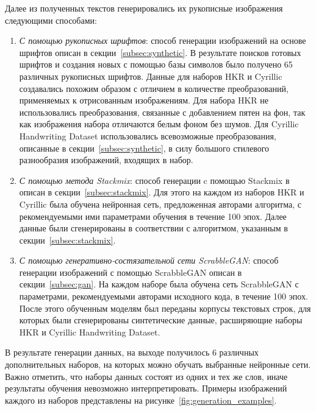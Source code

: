 Далее из полученных текстов генерировались их рукописные изображения следующими способами:
\begin{enumerate}
    \item \textit{С помощью рукописных шрифтов}:
    способ генерации изображений на основе шрифтов описан в секции~\ref{subsec:synthetic}.
    В результате поисков готовых шрифтов и создания новых с помощью базы символов было получено 65 различных рукописных шрифтов.
    Данные для наборов HKR и Cyrillic создавались похожим образом с отличием в количестве преобразований, применяемых к отрисованным изображениям.
    Для набора HKR не использовались преобразования, связанные с добавлением пятен на фон, так как изображения набора отличаются белым фоном без шумов.
    Для Cyrillic Handwriting Dataset использовались всевозможные преобразования, описанные в секции~\ref{subsec:synthetic},
    в силу большого стилевого разнообразия изображений, входящих в набор.
    \item \textit{С помощью метода Stackmix}:
    способ генерации c помощью Stackmix в описан в секции~\ref{subsec:stackmix}.
    Для этого на каждом из наборов HKR и Cyrillic была обучена нейронная сеть, предложенная авторами алгоритма,
    с рекомендуемыми ими параметрами обучения в течение 100 эпох.
    Далее данные были сгенерированы в соответствии с алгоритмом, указанным в секции~\ref{subsec:stackmix}.
    \item \textit{С помощью генеративно-состязательной сети ScrabbleGAN}:
    способ генерации изображений с помощью ScrabbleGAN описан в секции~\ref{subsec:gan}.
    На каждом наборе была обучена сеть ScrabbleGAN с параметрами, рекомендуемыми авторами исходного кода, в течение 100 эпох.
    После этого обученным моделям был переданы корпусы текстовых строк, для которых были сгенерированы синтетические
    данные, расширяющие наборы HKR и Cyrillic Handwriting Dataset.
\end{enumerate}

В результате генерации данных, на выходе получилось 6 различных дополнительных наборов, на которых можно обучать выбранные нейронные сети.
Важно отметить, что наборы данных состоят из одних и тех же слов, иначе результаты обучения невозможно интерпретировать.
Примеры изображений каждого из наборов представлены на рисунке~\ref{fig:generation_examples}.

